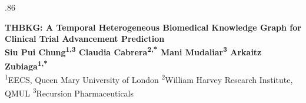 \documentclass[final,t]{beamer}
\begin{document}
\begin{frame}[t]


\vspace{-1.2cm}

\begin{columns}[T]
  \begin{column}{.86\linewidth}
    \vspace{0.5cm}
    \begin{center}
      {\color{white}\VeryHuge\bfseries
        THBKG: A Temporal Heterogeneous Biomedical
        Knowledge Graph for Clinical Trial
        Advancement Prediction}\\[0.8cm]
      {\color{white}\Large\bfseries
        Siu Pui Chung\textsuperscript{1,3}\quad
        Claudia Cabrera\textsuperscript{2,*}\quad
        Mani Mudaliar\textsuperscript{3}\quad
        Arkaitz Zubiaga\textsuperscript{1,*}}\\[0.4cm]
      {\color{white}\normalsize
        \textsuperscript{1}EECS, Queen Mary University of London\quad
        \textsuperscript{2}William Harvey Research Institute, QMUL\quad
        \textsuperscript{3}Recursion Pharmaceuticals}
    \end{center}
  \end{column}
\end{columns}


\end{frame}
\end{document}
